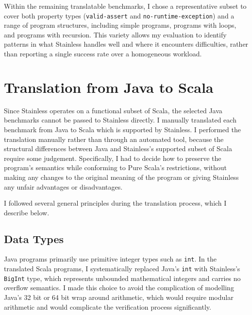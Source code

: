 \documentclass[11pt,titlepage,openright]{book}
\begin{document}
Within the remaining translatable benchmarks, I chose a representative subset 
to cover both property types (\texttt{valid-assert} and
\texttt{no-runtime-exception}) and a range of program structures,
including simple programs, programs with loops, and programs
with recursion. This
variety allows my evaluation to identify patterns in what Stainless
handles well and where it encounters difficulties, rather than reporting
a single success rate over a homogeneous workload.
 
 
\section{Translation from Java to Scala}
\label{sec:translation}
 
Since Stainless operates on a functional subset of Scala, the selected
Java benchmarks cannot be passed to Stainless directly. I manually translated each benchmark
from Java to Scala which is supported by Stainless. I performed the translation
manually rather than through an automated tool, because the structural
differences between Java and Stainless's supported subset of Scala require
some judgement. Specifically, I had to decide how to preserve the program's 
semantics while conforming to Pure Scala's restrictions, 
without making any changes to
the original meaning of the program or giving Stainless any unfair 
advantages or disadvantages.

I followed several general principles during the translation process, 
which I describe below.
 
\subsection{Data Types}
\label{sec:translation-types}
 
Java programs primarily use primitive integer types such as \texttt{int}.
In the translated Scala programs, I systematically replaced Java's \texttt{int}
with Stainless's \texttt{BigInt} type, which represents unbounded mathematical
integers and carries no overflow semantics. I made this choice to avoid the
complication of modelling Java's 32 bit or 64 bit wrap around arithmetic,
which would require modular arithmetic and would complicate the verification
process significantly.
\end{document}
